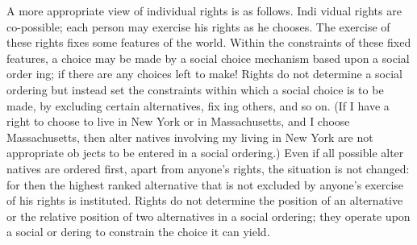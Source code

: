 \documentclass[11pt,openany]{book}
\begin{document}
A more appropriate view of individual rights is as follows. Indi vidual rights are co-possible; each person may exercise his rights as he chooses. The exercise of these rights fixes some features of the world. Within the constraints of these fixed features, a choice may be made by a social choice mechanism based upon a social order ing; if there are any choices left to make! Rights do not determine a social ordering but instead set the constraints within which a social choice is to be made, by excluding certain alternatives, fix ing others, and so on. (If I have a right to choose to live in New York or in Massachusetts, and I choose Massachusetts, then alter natives involving my living in New York are not appropriate ob jects to be entered in a social ordering.) Even if all possible alter natives are ordered first, apart from anyone's rights, the situation is not changed: for then the highest ranked alternative that is not excluded by anyone's exercise of his rights is instituted. Rights do not determine the position of an alternative or the relative position of two alternatives in a social ordering; they operate upon a social or dering to constrain the choice it can yield. 
\end{document}
